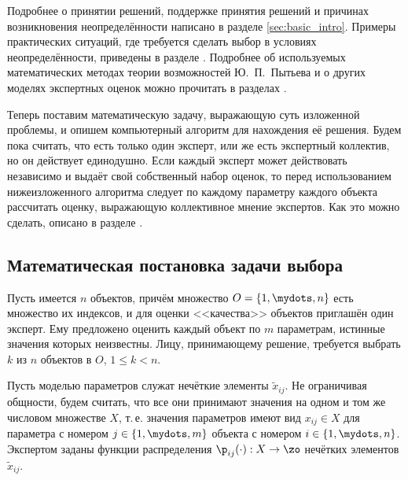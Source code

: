 Подробнее о принятии решений, поддержке принятия решений и причинах возникновения неопределённости написано в разделе \ref{sec:basic_intro}. Примеры практических ситуаций, где требуется сделать выбор в условиях неопределённости, приведены в разделе {}. Подробнее об используемых математических методах теории возможностей Ю.~П.~Пытьева и о других моделях экспертных оценок можно прочитать в разделах {}.

Теперь поставим математическую задачу, выражающую суть изложенной проблемы, и опишем компьютерный алгоритм для нахождения её решения. Будем пока считать, что есть только один эксперт, или же есть экспертный коллектив, но он действует единодушно. Если каждый эксперт может действовать независимо и выдаёт свой собственный набор оценок, то перед использованием нижеизложенного алгоритма следует по каждому параметру каждого объекта рассчитать оценку, выражающую коллективное мнение экспертов. Как это можно сделать, описано в разделе {}.

\subsection{Математическая постановка задачи выбора} %

Пусть имеется $n$ объектов, причём множество $O = \{1, \mydots, n\}$ есть множество их индексов, и для оценки <<качества>> объектов приглашён один эксперт. Ему предложено оценить каждый объект по $m$ параметрам, истинные значения которых неизвестны. Лицу, принимающему решение, требуется  выбрать $k$ из $n$ объектов в $O$, $1 \leq k < n$.

Пусть моделью параметров служат нечёткие элементы $\tilde x_{ij}$. Не ограничивая общности, будем считать, что все они принимают значения на одном и том же числовом множестве $X$, т.\,е. значения параметров имеют вид $x_{ij} \in X$ для параметра с номером $j \in \{1, \mydots, m\}$ объекта с номером $i \in \{1, \mydots, n\}$. Экспертом заданы функции распределения $\p_{ij}(\cdot): X \rightarrow \zo$ нечётких элементов $\tilde x_{ij}$. 


